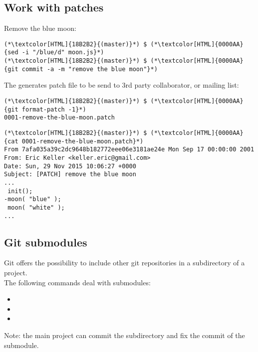 \subsection{Work with patches}
\begin{frame}[fragile]
    \subslidetitle

  Remove the blue moon:
  \begin{lstlisting}
(*\textcolor[HTML]{18B2B2}{(master)}*) $ (*\textcolor[HTML]{0000AA}{sed -i "/blue/d" moon.js}*)
(*\textcolor[HTML]{18B2B2}{(master)}*) $ (*\textcolor[HTML]{0000AA}{git commit -a -m "remove the blue moon"}*)
\end{lstlisting}

  The  generates patch file to be send to 3rd party collaborator, or mailing list:
  \begin{lstlisting}
(*\textcolor[HTML]{18B2B2}{(master)}*) $ (*\textcolor[HTML]{0000AA}{git format-patch -1}*)
0001-remove-the-blue-moon.patch
\end{lstlisting}

  \begin{lstlisting}
(*\textcolor[HTML]{18B2B2}{(master)}*) $ (*\textcolor[HTML]{0000AA}{cat 0001-remove-the-blue-moon.patch}*)
From 7afa035a39c2dc9648b182772eee06e3181ae24e Mon Sep 17 00:00:00 2001
From: Eric Keller <keller.eric@gmail.com>
Date: Sun, 29 Nov 2015 10:06:27 +0000
Subject: [PATCH] remove the blue moon
...
 init();
-moon( "blue" );
 moon( "white" );
...
\end{lstlisting}

\end{frame}

\subsection{Git submodules}
\begin{frame}[fragile]
  \subslidetitle
  Git offers the possibility to include other git repositories in a subdirectory of a project.
  \\
  \vspace{1em}
  The following commands deal with submodules:
  \begin{itemize}
    \item {}
    \item {}
    \item {}
  \end{itemize}
  \vspace{1em}
  Note: the main project can commit the subdirectory and fix the commit of the submodule.
\end{frame}

